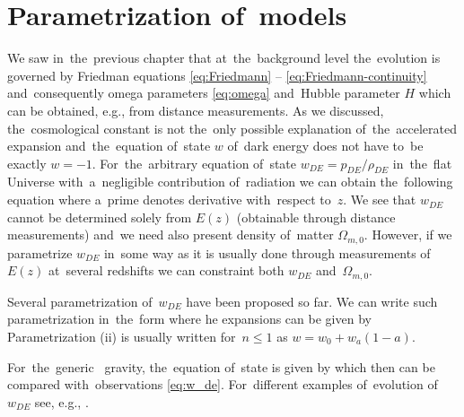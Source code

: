 \section{Parametrization of~models}
We saw in~the~previous chapter that at~the~background level the~evolution is governed by Friedman equations \eqref{eq:Friedmann} -- \eqref{eq:Friedmann-continuity} and~consequently omega parameters \eqref{eq:omega} and~Hubble parameter $H$ which can be obtained, e.g., from distance measurements. As we discussed, the~cosmological constant is not the~only possible explanation of~the~accelerated expansion and~the~equation of~state \(w\) of~dark energy does not have to~be exactly \(w=-1\). For~the~arbitrary equation of~state $w_{DE}=p_{DE}/\rho_{DE}$ in~the~flat Universe with~a~negligible contribution of~radiation we can obtain the~following equation
where a~prime denotes derivative with~respect to~\(z\). We see that \(w_{DE}\) cannot be determined solely from \(E(z)\) (obtainable through distance measurements) and~we need also present density of~matter \(\Omega_{m,0}\). However, if we parametrize \(w_{DE}\) in~some way as it is usually done through measurements of~\(E(z)\) at~several redshifts we can constraint both \(w_{DE}\) and~\(\Omega_{m,0}\).

Several parametrization  of~\(w_{DE}\) have been proposed so far. We can write such parametrization  in~the~form
where he expansions can be given by
Parametrization (ii) is usually written for~\(n\leq1\) as \(w=w_0+w_a(1-a)\).

For~the~generic \fR\ gravity, the~equation of~state is given by \parencite{2013qopu.conf...73B}
which then can be compared with~observations \eqref{eq:w_de}. For~different examples of~evolution of~$w_{DE}$ see, e.g., \textcite{2020arXiv200707717A}.
